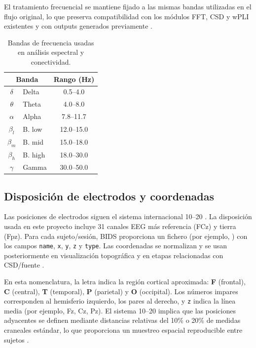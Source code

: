 El tratamiento frecuencial se mantiene fijado a las mismas bandas utilizadas en el flujo original, lo que preserva compatibilidad con los módulos FFT, CSD y wPLI existentes y con outputs generados previamente \citep{Cohen2014,Sanei2022,Ruth2020}.

\begin{table}[H]
\centering
\caption{Bandas de frecuencia usadas en análisis espectral y conectividad.}
\label{tab:frequency-bands}
\begin{tabular}{@{}clc@{}}
\toprule
\multicolumn{2}{c}{\textbf{Banda}} & \textbf{Rango (Hz)} \\
\midrule
$\delta$ & Delta & 0.5--4.0 \\
$\theta$ & Theta & 4.0--8.0 \\
$\alpha$ & Alpha & 7.8--11.7 \\
$\beta_l$ & B. low & 12.0--15.0 \\
$\beta_m$ & B. mid & 15.0--18.0 \\
$\beta_h$ & B. high & 18.0--30.0 \\
$\gamma$ & Gamma & 30.0--50.0 \\
\bottomrule
\end{tabular}
\end{table}

\subsection{Disposición de electrodos y coordenadas}

Las posiciones de electrodos siguen el sistema internacional 10--20 \citep{Yamada2018,IriarteFranco2013}. La disposición usada en este proyecto incluye 31 canales EEG más referencia (FCz) y tierra (Fpz). Para cada sujeto/sesión, BIDS proporciona un fichero  (por ejemplo, ) con los campos \texttt{name}, \texttt{x}, \texttt{y}, \texttt{z} y \texttt{type}. Las coordenadas se normalizan y se usan posteriormente en visualización topográfica y en etapas relacionadas con CSD/fuente \citep{Cohen2014}.

En esta nomenclatura, la letra indica la región cortical aproximada: \textbf{F} (frontal), \textbf{C} (central), \textbf{T} (temporal), \textbf{P} (parietal) y \textbf{O} (occipital). Los números impares corresponden al hemisferio izquierdo, los pares al derecho, y \texttt{z} indica la línea media (por ejemplo, Fz, Cz, Pz). El sistema 10--20 implica que las posiciones adyacentes se definen mediante distancias relativas del 10\% o 20\% de medidas craneales estándar, lo que proporciona un muestreo espacial reproducible entre sujetos \citep{Yamada2018,IriarteFranco2013}.

